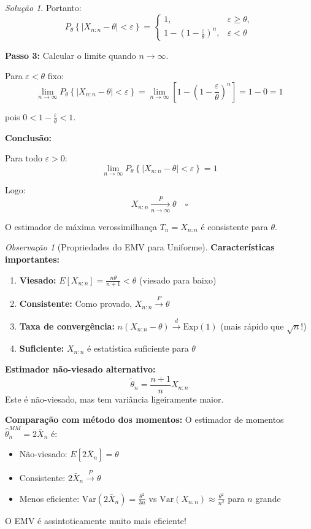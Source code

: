 \documentclass[12pt,a4paper]{article}
\theoremstyle{definition}
\theoremstyle{remark}
\newtheorem{solucao}{Solução}[section]
\newtheorem{observacao}{Observação}[section]
\begin{document}
\begin{solucao}
Portanto:
\[
P_\theta \left\{ |X_{n:n} - \theta| < \varepsilon \right\} = 
\begin{cases}
1, & \varepsilon \geq \theta, \\
1 - \left( 1 - \frac{\varepsilon}{\theta} \right)^n, & \varepsilon < \theta
\end{cases}
\]

\textbf{Passo 3:} Calcular o limite quando $n \to \infty$.

Para $\varepsilon < \theta$ fixo:
\[
\lim_{n \to \infty} P_\theta \left\{ |X_{n:n} - \theta| < \varepsilon \right\} = \lim_{n \to \infty} \left[1 - \left(1 - \frac{\varepsilon}{\theta}\right)^n\right] = 1 - 0 = 1
\]

pois $0 < 1 - \frac{\varepsilon}{\theta} < 1$.

\textbf{Conclusão:}

Para todo $\varepsilon > 0$:
\[
\lim_{n \to \infty} P_\theta \left\{ |X_{n:n} - \theta| < \varepsilon \right\} = 1
\]

Logo:
\[
X_{n:n} \xrightarrow[n \to \infty]{P} \theta \quad \square
\]

O estimador de máxima verossimilhança $T_n = X_{n:n}$ é consistente para $\theta$.
\end{solucao}

\begin{observacao}[Propriedades do EMV para Uniforme]
\textbf{Características importantes:}
\begin{enumerate}
    \item \textbf{Viesado:} $E[X_{n:n}] = \frac{n\theta}{n+1} < \theta$ (viesado para baixo)
    \item \textbf{Consistente:} Como provado, $X_{n:n} \xrightarrow{P} \theta$
    \item \textbf{Taxa de convergência:} $n(X_{n:n} - \theta) \xrightarrow{d} \text{Exp}(1)$ (mais rápido que $\sqrt{n}$!)
    \item \textbf{Suficiente:} $X_{n:n}$ é estatística suficiente para $\theta$
\end{enumerate}

\textbf{Estimador não-viesado alternativo:}
\[
\tilde{\theta}_n = \frac{n+1}{n} X_{n:n}
\]
Este é não-viesado, mas tem variância ligeiramente maior.

\textbf{Comparação com método dos momentos:}
O estimador de momentos $\hat{\theta}_n^{MM} = 2\bar{X}_n$ é:
\begin{itemize}
    \item Não-viesado: $E[2\bar{X}_n] = \theta$
    \item Consistente: $2\bar{X}_n \xrightarrow{P} \theta$
    \item Menos eficiente: $\text{Var}(2\bar{X}_n) = \frac{\theta^2}{3n}$ vs $\text{Var}(X_{n:n}) \approx \frac{\theta^2}{n^2}$ para $n$ grande
\end{itemize}

O EMV é assintoticamente muito mais eficiente!
\end{observacao}
\end{document}
